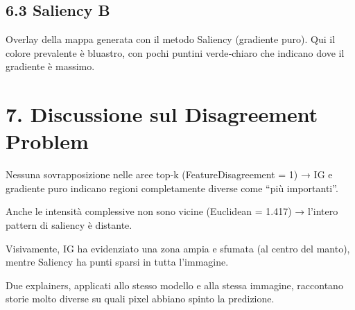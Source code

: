 \documentclass[a4paper,11pt]{article}
\begin{document}
\subsection*{6.3 Saliency B}
Overlay della mappa generata con il metodo Saliency (gradiente puro). Qui il colore prevalente è bluastro, con pochi puntini verde‐chiaro che indicano dove il gradiente è massimo.

\section*{7. Discussione sul Disagreement Problem}
Nessuna sovrapposizione nelle aree top‐k (FeatureDisagreement = 1) → IG e gradiente puro indicano regioni completamente diverse come “più importanti”.

Anche le intensità complessive non sono vicine (Euclidean = 1.417) → l’intero pattern di saliency è distante.

Visivamente, IG ha evidenziato una zona ampia e sfumata (al centro del manto), mentre Saliency ha punti sparsi in tutta l’immagine.

Due explainers, applicati allo stesso modello e alla stessa immagine, raccontano storie molto diverse su quali pixel abbiano spinto la predizione.
\end{document}
